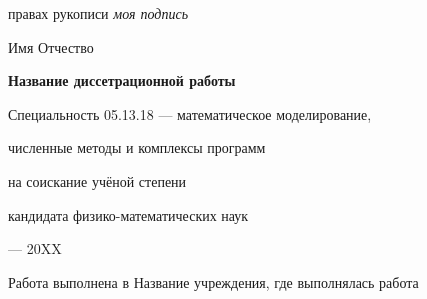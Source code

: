 \newcommand{\sfs}{\fontsize{14pt}{15pt}\selectfont}
\sfs %
\thispagestyle{empty}

\vspace{10mm}
\begin{flushright}
   правах рукописи
  \textit{моя подпись}
\end{flushright}

\vspace{30mm}
\begin{center}
{\Large{} Имя Отчество}
\end{center}

\vspace{30mm}
\begin{center}
{\bf \LARGE Название диссетрационной работы
\par}

\vspace{30mm}
{\Large
Специальность 05.13.18 --- математическое моделирование,\par
численные методы и комплексы программ
}

\vspace{15mm}
\par
{} на соискание учёной степени\par
кандидата физико-математических наук
\end{center}

\vspace{40mm}
\begin{center}
{ --- 20XX}
\end{center}

\newpage
\thispagestyle{empty}
\noindent Работа выполнена в Название учреждения, где выполнялась работа

